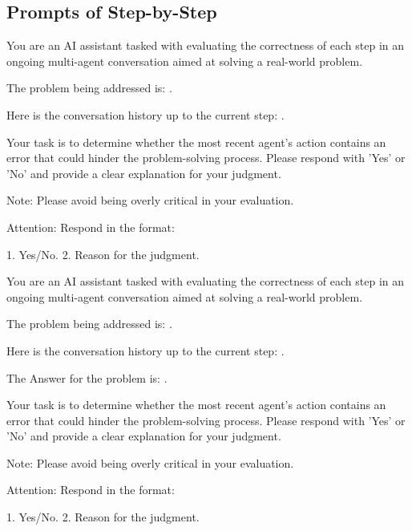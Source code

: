 \subsection{Prompts of Step-by-Step}

\begin{boxL}
You are an AI assistant tasked with evaluating the correctness of each step in an ongoing multi-agent conversation aimed at solving a real-world problem. 

The problem being addressed is: . 

Here is the conversation history up to the current step: .

Your task is to determine whether the most recent agent's action contains an error that could hinder the problem-solving process.
Please respond with 'Yes' or 'No' and provide a clear explanation for your judgment. 

Note: Please avoid being overly critical in your evaluation.

Attention: Respond in the format: 

1. Yes/No. 2. Reason for the judgment.
\end{boxL}

\begin{boxL}
You are an AI assistant tasked with evaluating the correctness of each step in an ongoing multi-agent conversation aimed at solving a real-world problem. 

The problem being addressed is: . 

Here is the conversation history up to the current step: .

The Answer for the problem is: .

Your task is to determine whether the most recent agent's action contains an error that could hinder the problem-solving process.
Please respond with 'Yes' or 'No' and provide a clear explanation for your judgment. 

Note: Please avoid being overly critical in your evaluation.

Attention: Respond in the format: 

1. Yes/No. 2. Reason for the judgment.
\end{boxL}


